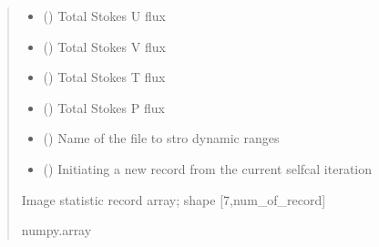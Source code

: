 \documentclass[letterpaper,10pt,english]{sphinxmanual}
\begin{document}
\begin{fulllineitems}
\begin{fulllineitems}
\begin{quote}
\begin{description}
\begin{itemize}
\item {} 
\sphinxAtStartPar
{} () \textendash{} Total Stokes U flux

\item {} 
\sphinxAtStartPar
{} () \textendash{} Total Stokes V flux

\item {} 
\sphinxAtStartPar
{} () \textendash{} Total Stokes T flux

\item {} 
\sphinxAtStartPar
{} () \textendash{} Total Stokes P flux

\item {} 
\sphinxAtStartPar
{} () \textendash{} Name of the file to stro dynamic ranges

\item {} 
\sphinxAtStartPar
{} () \textendash{} Initiating a new record from the current selfcal iteration

\end{itemize}

\item[{Returns}] \leavevmode
\sphinxAtStartPar
Image statistic record array; shape {[}7,num\_of\_record{]}

\item[{Return type}] \leavevmode
\sphinxAtStartPar
numpy.array

\end{description}\end{quote}

\end{fulllineitems}



\end{fulllineitems}
\end{document}
